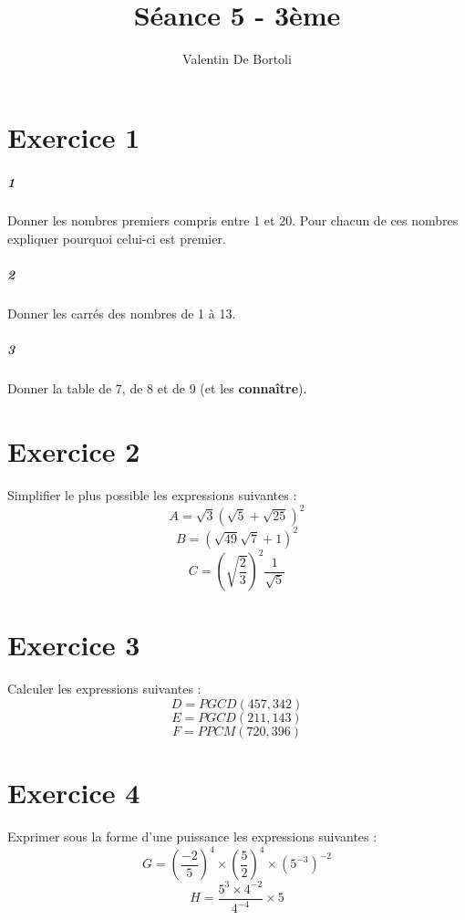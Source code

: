 \documentclass[10pt,a4paper]{article}
\title{Séance 5 - 3ème}
\author{Valentin De Bortoli}
\begin{document}
\maketitle
\section{Exercice 1}
\subparagraph{1} Donner les nombres premiers compris entre 1 et 20. Pour chacun de ces nombres expliquer pourquoi celui-ci est premier.
\subparagraph{2} Donner les carrés des nombres de 1 à 13.
\subparagraph{3} Donner la table de 7, de 8 et de 9 (et les \textbf{connaître}).
\section{Exercice 2}
Simplifier le plus possible les expressions suivantes :
\begin{equation}
A=\sqrt{3}(\sqrt{5}+\sqrt{25})^2
\end{equation}
\begin{equation}
B=(\sqrt{49}\sqrt{7} +1)^2
\end{equation}
\begin{equation}
C=\left( \sqrt{\frac{2}{3}} \right)^2 \frac{1}{\sqrt{5}}
\end{equation}
\section{Exercice 3}
Calculer les expressions suivantes :
\begin{equation}
D=PGCD(457,342)
\end{equation}
\begin{equation}
E=PGCD(211,143)
\end{equation}
\begin{equation}
F=PPCM(720,396)
\end{equation}
\section{Exercice 4}
Exprimer sous la forme d'une puissance les expressions suivantes :
\begin{equation}
G=\left( \frac{-2}{5} \right)^4 \times \left( \frac{5}{2} \right)^4 \times (5^{-3})^{-2}
\end{equation}
\begin{equation}
H=\frac{5^3 \times 4^{-2}}{4^{-4}}\times 5
\end{equation}
\end{document}
